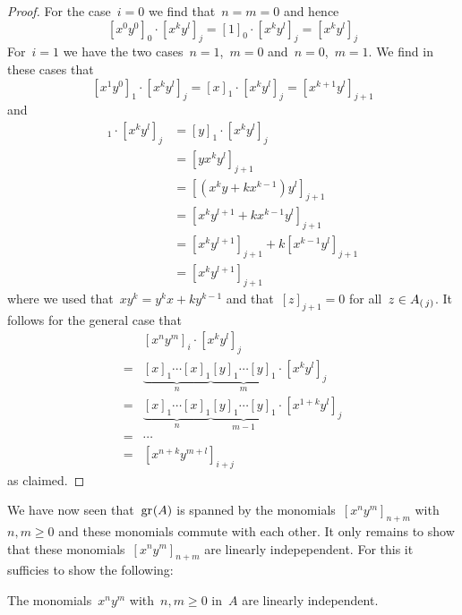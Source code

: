 \begin{example}
  \begin{proof}
    For the case~$i = 0$ we find that~$n = m = 0$ and hence
    \[
      [x^0 y^0]_0 \cdot [x^k y^l]_j
      =
      [1]_0 \cdot [x^k y^l]_j
      =
      [x^k y^l]_j
    \]
    For~$i = 1$ we have the two cases~$n = 1$,~$m = 0$ and~$n = 0$,~$m = 1$.
    We find in these cases that
    \[
      [x^1 y^0]_1 \cdot [x^k y^l]_j
      =
      [x]_1 \cdot [x^k y^l]_j
      =
      [x^{k+1} y^l]_{j+1}
    \]
    and
    \begin{align*}
      [x^0 y^1]_1 \cdot [x^k y^l]_j
      &=
      [y]_1 \cdot [x^k y^l]_j
      \\
      &=
      [y x^k y^l]_{j+1}
      \\
      &=
      [(x^k y + k x^{k-1}) y^l]_{j+1}
      \\
      &=
      [x^k y^{l+1} + k x^{k-1} y^l]_{j+1}
      \\
      &=
      [x^k y^{l+1}]_{j+1} + k [x^{k-1} y^l]_{j+1}
      \\
      &=
      [x^k y^{l+1}]_{j+1}
    \end{align*}
    where we used that~$x y^k = y^k x + k y^{k-1}$ and that~$[z]_{j+1} = 0$ for all~$z \in A_{(\, j)}$.
    It follows for the general case that
    \begin{align*}
      {}&
      [x^n y^m]_i \cdot [x^k y^l]_j
      \\
      ={}&
      \underbrace{ [x]_1 \dotsm [x]_1 }_{n}
      \underbrace{ [y]_1 \dotsm [y]_1 }_{m}
      \cdot
      [x^k y^l]_j
      \\
      ={}&
      \underbrace{ [x]_1 \dotsm [x]_1 }_{n}
      \underbrace{ [y]_1 \dotsm [y]_1 }_{m-1}
      \cdot
      [x^{1+k}  y^l]_j
      \\
      ={}&
      \dotsb
      \\
      ={}&
      [x^{n+k} y^{m+l}]_{i+j}
    \end{align*}
    as claimed.
  \end{proof}

  We have now seen that~$\gr(A)$ is spanned by the monomials~$[x^n y^m]_{n+m}$ with~$n, m \geq 0$ and these monomials commute with each other.
  It only remains to show that these monomials~$[x^n y^m]_{n+m}$ are linearly indepependent.
  For this it sufficies to show the following:
  
  \begin{claim}
    \label{linear independence of monomials}
    The monomials~$x^n y^m$ with~$n, m \geq 0$ in~$A$ are linearly independent.
  \end{claim}
  

\end{example}
